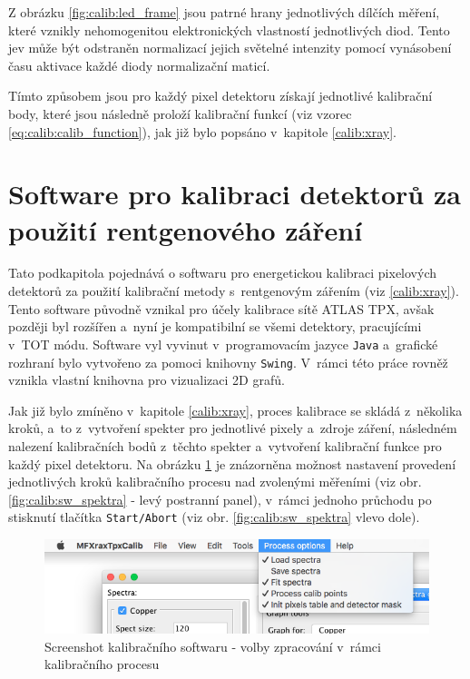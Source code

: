 Z obrázku \ref{fig:calib:led_frame} jsou patrné hrany jednotlivých dílčích měření, které vznikly nehomogenitou elektronických vlastností jednotlivých diod. Tento jev může být odstraněn normalizací jejich světelné intenzity pomocí vynásobení času aktivace každé diody normalizační maticí.

Tímto způsobem jsou pro každý pixel detektoru získají jednotlivé kalibrační body, které jsou následně proloží kalibrační funkcí (viz vzorec \ref{eq:calib:calib_function}), jak již bylo popsáno v~kapitole \ref{calib:xray}.


\newpage
\section{Software pro kalibraci detektorů za použití rentgenového záření}\label{calib:sw}

Tato podkapitola pojednává o softwaru pro energetickou kalibraci pixelových detektorů za použití kalibrační metody s~rentgenovým zářením (viz \ref{calib:xray}). Tento software původně vznikal pro účely kalibrace sítě ATLAS TPX, avšak později byl rozšířen a~nyní je kompatibilní se všemi detektory, pracujícími v~TOT módu. Software vyl vyvinut v~programovacím jazyce \texttt{Java} a~grafické rozhraní bylo vytvořeno za pomoci knihovny \texttt{Swing}. V~rámci této práce rovněž vznikla vlastní knihovna pro vizualizaci 2D grafů.

Jak již bylo zmíněno v~kapitole \ref{calib:xray}, proces kalibrace se skládá z~několika kroků, a~to z~vytvoření spekter pro jednotlivé pixely a~zdroje záření, následném nalezení kalibračních bodů z~těchto spekter a~vytvoření kalibrační funkce pro každý pixel detektoru. Na obrázku \ref{fig:calib:sw_process_ops} je znázorněna možnost nastavení provedení jednotlivých kroků kalibračního procesu nad zvolenými měřeními (viz obr. \ref{fig:calib:sw_spektra} - levý postranní panel), v~rámci jednoho průchodu po stisknutí tlačítka \texttt{Start/Abort} (viz obr. \ref{fig:calib:sw_spektra} vlevo dole).

\begin{figure}[th]
	\begin{center}
		\includegraphics[width=14cm]{figures/calibsw_process_ops.png}
		\caption{Screenshot kalibračního softwaru - volby zpracování v~rámci kalibračního procesu}
		\label{fig:calib:sw_process_ops}
	\end{center}
\end{figure}


